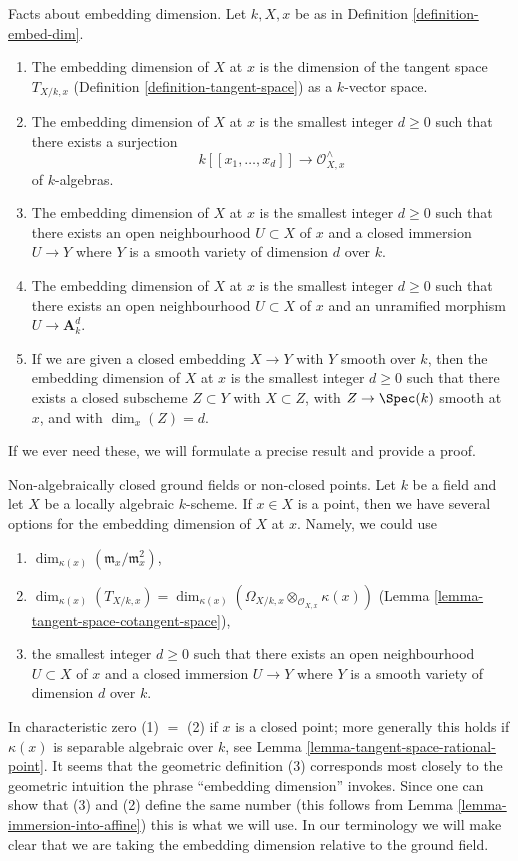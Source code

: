 \noindent
Facts about embedding dimension.
Let $k, X, x$ be as in Definition \ref{definition-embed-dim}.
\begin{enumerate}
\item The embedding dimension of $X$ at $x$ is
the dimension of
the tangent space $T_{X/k, x}$ (Definition \ref{definition-tangent-space})
as a $k$-vector space.
\item The embedding dimension of $X$ at $x$ is the smallest integer
$d \geq 0$ such that there exists a surjection
$$
k[[x_1, \ldots, x_d]] \longrightarrow \mathcal{O}_{X, x}^\wedge
$$
of $k$-algebras.
\item The embedding dimension of $X$ at $x$ is the smallest integer
$d \geq 0$ such that there exists an open neighbourhood $U \subset X$
of $x$ and a closed immersion $U \to Y$ where $Y$ is a smooth variety
of dimension $d$ over $k$.
\item The embedding dimension of $X$ at $x$ is the smallest integer
$d \geq 0$ such that there exists an open neighbourhood $U \subset X$
of $x$ and an unramified morphism $U \to \mathbf{A}^d_k$.
\item If we are given a closed embedding $X \to Y$ with $Y$ smooth
over $k$, then the embedding dimension of $X$ at $x$ is the smallest
integer $d \geq 0$ such that there exists a closed subscheme $Z \subset Y$
with $X \subset Z$, with $Z \to \Spec(k)$ smooth at $x$, and with
$\dim_x(Z) = d$.
\end{enumerate}
If we ever need these, we will formulate a precise result and provide
a proof.

\medskip\noindent
Non-algebraically closed ground fields or non-closed points.
Let $k$ be a field and let $X$ be a locally algebraic $k$-scheme.
If $x \in X$ is a point, then we have several options for the
embedding dimension of $X$ at $x$. Namely, we could use
\begin{enumerate}
\item $\dim_{\kappa(x)}(\mathfrak m_x/\mathfrak m_x^2)$,
\item $\dim_{\kappa(x)}(T_{X/k, x}) =
\dim_{\kappa(x)}(\Omega_{X/k, x} \otimes_{\mathcal{O}_{X, x}} \kappa(x))$
(Lemma \ref{lemma-tangent-space-cotangent-space}),
\item the smallest integer $d \geq 0$ such that there exists an
open neighbourhood $U \subset X$ of $x$ and a closed immersion
$U \to Y$ where $Y$ is a smooth variety of dimension $d$ over $k$.
\end{enumerate}
In characteristic zero (1) $=$ (2) if $x$ is a closed point;
more generally this holds if $\kappa(x)$ is separable algebraic
over $k$, see
Lemma \ref{lemma-tangent-space-rational-point}.
It seems that the geometric
definition (3) corresponds most closely to the geometric
intuition the phrase ``embedding dimension'' invokes.
Since one can show that (3) and (2) define the same number
(this follows from Lemma \ref{lemma-immersion-into-affine})
this is what we will use.
In our terminology we will make clear that we are
taking the embedding dimension relative to the ground field.


